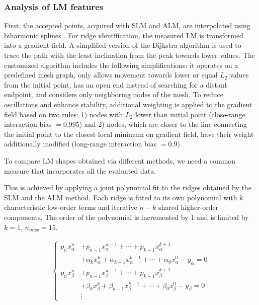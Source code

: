 \documentclass[journal,twoside,web]{ieeecolor2}
\begin{document}
\subsubsection{Analysis of LM features}
First, the accepted points, acquired with SLM and ALM, are interpolated using biharmonic splines \cite{DZ2011}.
For ridge identification, the measured LM is transformed into a gradient field.
A simplified version of the Dijkstra algorithm \cite{Di1959} is used to trace the path with the least inclination from the peak towards lower values.
The customized algorithm includes the following simplifications: it operates on a predefined mesh graph, only allows movement towards lower or equal $L_2$ values from the initial point, has an open end instead of searching for a distant endpoint, and considers only neighboring nodes of the mesh.
To reduce oscillations and enhance stability, additional weighting is applied to the gradient field based on two rules: 1) nodes with $L_2$ lower than initial point (close-range interaction bias $= 0.995$) and 2) nodes, which are closer to the line connecting the initial point to the closest local minimum on gradient field, have their weight additionally modified (long-range interaction bias $= 0.9$).


To compare LM shapes obtained via different methods, we need a common measure that incorporates all the evaluated data.


This is achieved by applying a joint polynomial fit to the ridges obtained by the SLM and the ALM method.
Each ridge is fitted to its own polynomial with $k$ characteristic low-order terms and iterative $n-k$ shared higher-order components.
The order of the polynomial is incremented by 1 and is limited by $k = 1$, $n_{max} = 15$.


\begin{align}
\begin{cases}
p_{n} x_{\alpha}^n&+p_{n-1} x_{\alpha}^{n-1}+\cdots+p_{k+1} x_{\alpha}^{k+1} \\
&+\alpha_k x_{\alpha}^{k}+\alpha_{k-1} x_{\alpha}^{k-1}+\cdots+\alpha _0 x_{\alpha}^0-y_{\alpha} =0 \\
p_{n} x_{\beta}^n&+p_{n-1} x_{\beta}^{n-1}+\cdots+p_{k+1} x_{\beta}^{k+1} \\
&+\beta_k x_{\beta}^{k}+\beta_{k-1} x_{\beta}^{k-1}+\cdots+\beta _0 x_{\beta}^0-y_{\beta} =0 \\
& \vdots 
\end{cases}
\label{eq1}
\end{align}
\end{document}
